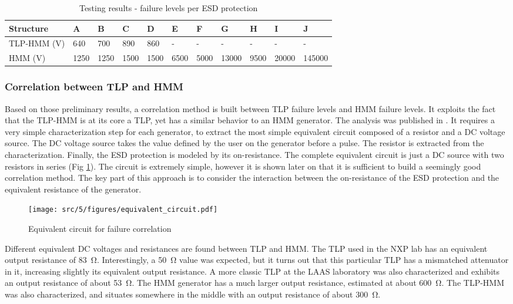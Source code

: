 \begin{table}[!h]
\centering
\begin{tabular}{@{}lllllllllll@{}}
\toprule
Structure   & A     & B     & C      & D    & E    & F    & G     & H    & I     & J      \\ \midrule
TLP-HMM (V) & 640   & 700   & 890    & 860  & -    & -    & -     & -    & -     & -      \\
HMM     (V) & 1250  & 1250  & 1500   & 1500 & 6500 & 5000 & 13000 & 9500 & 20000 & 145000 \\
\end{tabular}
\caption{Testing results - failure levels per ESD protection}
\label{tab:esd-protections-results}
\end{table}

\subsubsection{Correlation between TLP and HMM}

Based on those preliminary results, a correlation method is built between TLP failure levels and HMM failure levels.
It exploits the fact that the TLP-HMM is at its core a TLP, yet has a similar behavior to an HMM generator.
The analysis was published in \cite{my-publi-tlp-hmm}.
It requires a very simple characterization step for each generator, to extract the most simple equivalent circuit composed of a resistor and a DC voltage source.
The DC voltage source takes the value defined by the user on the generator before a pulse.
The resistor is extracted from the characterization.
Finally, the ESD protection is modeled by its on-resistance.
The complete equivalent circuit is just a DC source with two resistors in series (Fig \ref{fig:simple_equivalent_circuit}).
The circuit is extremely simple, however it is shown later on that it is sufficient to build a seemingly good correlation method.
The key part of this approach is to consider the interaction between the on-resistance of the ESD protection and the equivalent resistance of the generator.

\begin{figure}[!h]
  \centering
  \texttt{[image: src/5/figures/equivalent\_circuit.pdf]}
  \caption{Equivalent circuit for failure correlation}
  \label{fig:simple_equivalent_circuit}
\end{figure}

Different equivalent DC voltages and resistances are found between TLP and HMM.
The TLP used in the NXP lab has an equivalent output resistance of \SI{83}{\ohm}.
Interestingly, a \SI{50}{\ohm} value was expected, but it turns out that this particular TLP has a mismatched attenuator in it, increasing slightly its equivalent output resistance.
A more classic TLP at the LAAS laboratory was also characterized and exhibits an output resistance of about \SI{53}{\ohm}.
The HMM generator has a much larger output resistance, estimated at about \SI{600}{\ohm}.
The TLP-HMM was also characterized, and situates somewhere in the middle with an output resistance of about \SI{300}{\ohm}.

